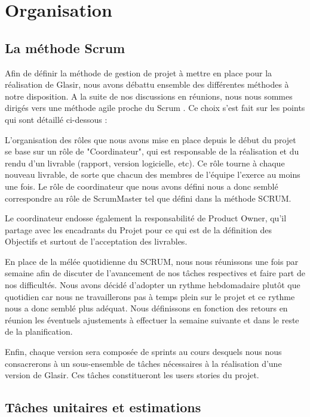 \section{Organisation}
	\label{sec:orga}
	\subsection{La méthode Scrum}
	\label{sec:gestion}

	Afin de définir la méthode de gestion de projet à mettre en place pour la réalisation de Glasir, nous avons débattu ensemble des différentes méthodes à notre disposition. A la suite de 	nos discussions en réunions, nous nous sommes dirigés vers une méthode agile proche du \og Scrum \fg. Ce choix s'est fait sur les points qui sont détaillé ci-dessous :

	L'organisation des rôles que nous avons mise en place depuis le début du projet se base sur un rôle de "Coordinateur", qui est responsable de la réalisation et du rendu d'un livrable (rapport, version logicielle, etc). Ce rôle tourne à chaque nouveau livrable, de sorte que chacun des membres de l'équipe l'exerce au moins une fois. Le rôle de coordinateur que nous avons défini nous a donc semblé correspondre au rôle de ScrumMaster tel que défini dans la méthode SCRUM.

	Le coordinateur endosse également la responsabilité de Product Owner, qu'il partage avec les encadrants du Projet pour ce qui est de la définition des Objectifs et surtout de l'acceptation des livrables.

	En place de la mélée quotidienne du SCRUM, nous nous réunissons une fois par semaine afin de discuter de l'avancement de nos tâches respectives et faire part de nos difficultés. Nous avons décidé d'adopter un rythme hebdomadaire plutôt que quotidien car nous ne travaillerons pas à temps plein sur le projet et ce rythme nous a donc semblé plus adéquat. Nous définissons en fonction des retours en réunion les éventuels ajustements à effectuer la semaine suivante et dans le reste de la planification.

	Enfin, chaque version sera composée de sprints au cours desquels nous nous consacrerons à un sous-ensemble de tâches nécessaires à la réalisation d'une version de Glasir. Ces tâches constitueront les users stories du projet. 
	
	\subsection{Tâches unitaires et estimations}
	\label{sec:taches_unitaires}

